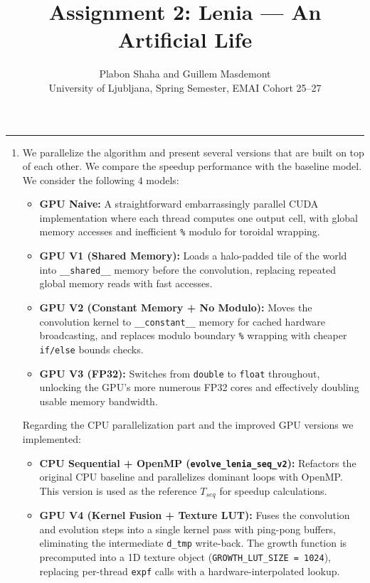 \documentclass[11pt, a4paper]{article}
\title{\LARGE\textbf{Assignment 2: Lenia — An Artificial Life} \\[-0.2em]}
\author{
    Plabon Shaha and Guillem Masdemont \\ 
    \small University of Ljubljana, Spring Semester, EMAI Cohort 25--27 
}
\makeatletter
\renewcommand{\maketitle}{
  \begin{flushleft}
    {\huge \textbf{\@title} \par}
    \vspace{0.5cm}
    {\large \@author \par}
    \vspace{0.2cm}
    {\@date \par}
    \vspace{0.2cm}
    \hrule
  \end{flushleft}
}
\makeatother
\begin{document}
\maketitle

\begin{enumerate}
  \item[\textbf{Implementation}] We parallelize the algorithm and present several versions that are built on top of each other. We compare the speedup performance with the baseline model. We consider the following $4$ models: 

\begin{itemize}
    \item \textbf{GPU Naive:} A straightforward embarrassingly parallel CUDA implementation where each thread computes one output cell, with global memory accesses and inefficient \texttt{\%} modulo for toroidal wrapping.

    \item \textbf{GPU V1 (Shared Memory):} Loads a halo-padded tile of the world into \texttt{\_\_shared\_\_} memory before the convolution, replacing repeated global memory reads with fast accesses.

    \item \textbf{GPU V2 (Constant Memory + No Modulo):} Moves the convolution kernel to \texttt{\_\_constant\_\_} memory for cached hardware broadcasting, and replaces modulo boundary \texttt{\%} wrapping with cheaper \texttt{if/else} bounds checks.

    \item \textbf{GPU V3 (FP32):} Switches from \texttt{double} to \texttt{float} throughout, unlocking the GPU's more numerous FP32 cores and effectively doubling usable memory bandwidth.
\end{itemize}

Regarding the CPU parallelization part and the improved GPU versions we implemented:

\begin{itemize}
  \item \textbf{CPU Sequential + OpenMP (\texttt{evolve\_lenia\_seq\_v2}):} Refactors the original CPU baseline and parallelizes dominant loops with OpenMP. This version is used as the reference $T_{seq}$ for speedup calculations.
  
    \item \textbf{GPU V4 (Kernel Fusion + Texture LUT):} Fuses the convolution and evolution steps into a single kernel pass with ping-pong buffers, eliminating the intermediate \texttt{d\_tmp} write-back. The growth function is precomputed into a 1D texture object (\texttt{GROWTH\_LUT\_SIZE = 1024}), replacing per-thread \texttt{expf} calls with a hardware-interpolated lookup.


\end{itemize}
\end{enumerate}
\end{document}

